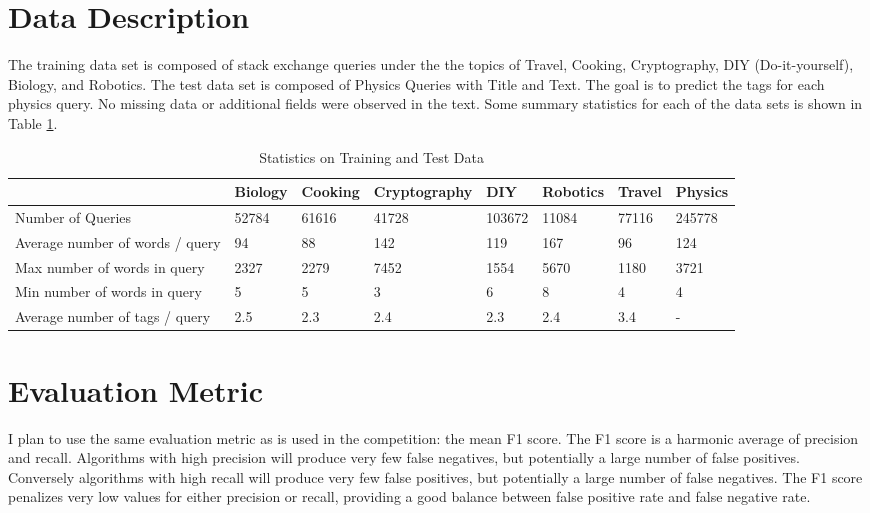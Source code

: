\documentclass{article}
\begin{document}
\section{Data Description}

The training data set is composed of stack exchange queries under the the
topics of Travel, Cooking, Cryptography, DIY (Do-it-yourself), 
Biology, and Robotics. The test data set is composed of Physics Queries with
Title and Text. The goal is to predict the tags for each physics query. No
missing data or additional fields were observed in the text. Some summary
statistics for each of the data sets is shown in Table \ref{tab:stats}. 

\begin{table}[]
\centering
\caption{Statistics on Training and Test Data}
\label{my-label}
\begin{tabular}{|l|l|l|l|l|l|l|l|}
\hline
                  & Biology & Cooking & Cryptography & DIY & Robotics & Travel & Physics \\ \hline
Number of Queries & 52784   & 61616   & 41728 & 103672 & 11084 & 77116 & 245778  \\ \hline
Average number of words / query & 94 & 88 & 142 & 119 & 167 & 96 & 124 \\ \hline
Max number of words in query & 2327 & 2279 & 7452 & 1554 & 5670 & 1180 & 3721 \\ \hline
Min number of words in query & 5 & 5 & 3 & 6 & 8 & 4 & 4 \\ \hline
Average number of tags / query & 2.5 & 2.3 & 2.4 & 2.3 & 2.4 & 3.4 & - \\ \hline

\end{tabular}
\label{tab:stats}
\end{table}

\section{Evaluation Metric}

I plan to use the same evaluation metric as is used in the competition: the
mean F1 score. The F1 score is a harmonic average of precision and
recall. Algorithms with high precision will produce very few false negatives,
but potentially a large number of false positives. Conversely algorithms with
high recall will produce very few false positives, but potentially a large
number of false negatives. The F1 score penalizes very low values for either
precision or recall, providing a good balance between false positive rate and
false negative rate.
\end{document}
